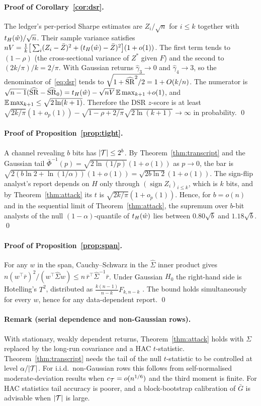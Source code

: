\paragraph{Proof of Corollary~\ref{cor:dsr}.}
The ledger's per-period Sharpe estimates are $Z_i/\sqrt n$ for $i\le k$ together with $t_{H}(\hat w)/\sqrt n$. Their sample variance satisfies $nV=\frac1{k}\big[\sum_i(Z_i-\bar Z)^2+(t_{H}(\hat w)-\bar Z)^2\big](1+o(1))$. The first term tends to $(1-\rho)$ (the cross-sectional variance of $Z^\ast$ given $F$) and the second to $(2k/\pi)/k=2/\pi$. With Gaussian returns $\hat\gamma_3\to0$ and $\hat\gamma_4\to3$, so the denominator of~\eqref{eq:dsr} tends to $\sqrt{1+\widehat{\mathrm{SR}}^2/2}=1+O(k/n)$. The numerator is $\sqrt{n-1}(\widehat{\mathrm{SR}}-\widehat{\mathrm{SR}}_0)=t_{H}(\hat w)-\sqrt{nV}\,\mathbb{E}\max_{k+1}+o(1)$, and $\mathbb{E}\max_{k+1}\le\sqrt{2\ln(k+1)}$. Therefore the DSR $z$-score is at least $\sqrt{2k/\pi}(1+o_p(1))-\sqrt{1-\rho+2/\pi}\sqrt{2\ln(k+1)}\to\infty$ in probability. \qed

\paragraph{Proof of Proposition~\ref{prop:tight}.}
A channel revealing $b$ bits has $|\mathcal{T}|\le2^b$. By Theorem~\ref{thm:transcript} and the Gaussian tail $\bar\Phi^{-1}(p)=\sqrt{2\ln(1/p)}(1+o(1))$ as $p\to0$, the bar is $\sqrt{2(b\ln2+\ln(1/\alpha))}(1+o(1))=\sqrt{2b\ln 2}(1+o(1))$. The sign-flip analyst's report depends on $H$ only through $(\operatorname{sign}Z_i)_{i\le k}$, which is $k$ bits, and by Theorem~\ref{thm:attack} its $t$ is $\sqrt{2k/\pi}(1+o_p(1))$. Hence, for $b=o(n)$ and in the sequential limit of Theorem~\ref{thm:attack}, the supremum over $b$-bit analysts of the null $(1-\alpha)$-quantile of $t_{H}(\hat w)$ lies between $0.80\sqrt b$ and $1.18\sqrt b$. \qed

\paragraph{Proof of Proposition~\ref{prop:span}.} For any $w$ in the span, Cauchy--Schwarz in the $\hat\Sigma$ inner product gives $n(w^\top\bar r)^2/(w^\top\hat\Sigma w)\le n\,\bar r^\top\hat\Sigma^{-1}\bar r$. Under Gaussian $H_0$ the right-hand side is Hotelling's $T^2$, distributed as $\frac{k(n-1)}{n-k}F_{k,n-k}$ \citep{scheffe1953method,gibbons1989test}. The bound holds simultaneously for every $w$, hence for any data-dependent report. \qed

\paragraph{Remark (serial dependence and non-Gaussian rows).} With stationary, weakly dependent returns, Theorem~\ref{thm:attack} holds with $\Sigma$ replaced by the long-run covariance and a HAC $t$-statistic. Theorem~\ref{thm:transcript} needs the tail of the null $t$-statistic to be controlled at level $\alpha/|\mathcal{T}|$. For i.i.d.\ non-Gaussian rows this follows from self-normalised moderate-deviation results when $c_{\mathcal{T}}=o(n^{1/6})$ and the third moment is finite. For HAC statistics tail accuracy is poorer, and a block-bootstrap calibration of $\bar G$ is advisable when $|\mathcal{T}|$ is large.
